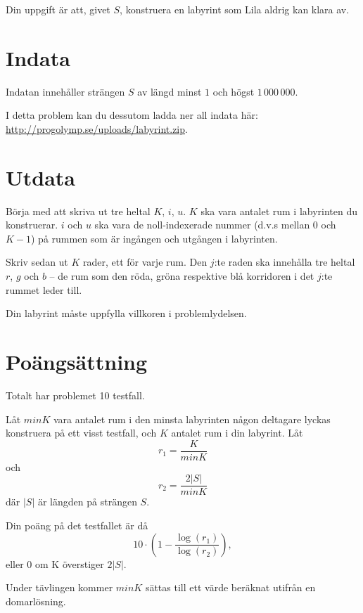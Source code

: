 Din uppgift är att, givet $S$, konstruera en labyrint som Lila aldrig kan klara av.

\section*{Indata}
Indatan innehåller strängen $S$ av längd minst $1$ och högst $1\,000\,000$.

I detta problem kan du dessutom ladda ner all indata här: \url{http://progolymp.se/uploads/labyrint.zip}.

\section*{Utdata}
Börja med att skriva ut tre heltal $K$, $i$, $u$.
$K$ ska vara antalet rum i labyrinten du konstruerar.
$i$ och $u$ ska vara de noll-indexerade nummer (d.v.s mellan $0$ och $K - 1$) på rummen som är ingången och utgången i labyrinten.

Skriv sedan ut $K$ rader, ett för varje rum.
Den $j$:te raden ska innehålla tre heltal $r$, $g$ och $b$ -- de rum som den röda, gröna respektive blå korridoren i det $j$:te rummet leder till.

Din labyrint måste uppfylla villkoren i problemlydelsen.

\section*{Poängsättning}
Totalt har problemet 10 testfall.

Låt $minK$ vara antalet rum i den minsta labyrinten någon deltagare lyckas konstruera på ett visst testfall, och $K$ antalet rum i din labyrint.
Låt
$$r_1 = \frac{K}{minK}$$
och
$$r_2 = \frac{2|S|}{minK}$$
där $|S|$ är längden på strängen $S$.

Din poäng på det testfallet är då
$$10 \cdot \left(1 - \frac{\log(r_1)}{\log(r_2)}\right),$$
eller 0 om K överstiger $2|S|$.

Under tävlingen kommer $minK$ sättas till ett värde beräknat utifrån en domarlösning.
